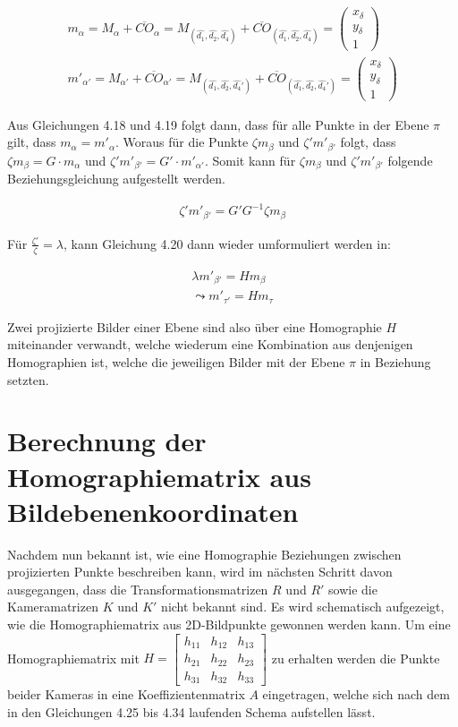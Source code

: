 \begin{gather}
	m_\alpha = M_\alpha + \overline{CO}_\alpha = M_{(\hat{d_1},\hat{d_2},\hat{d_4})} + \overline{CO}_{(\hat{d_1},\hat{d_2},\hat{d_4})} = \begin{pmatrix}
		x_\delta\\
		y_\delta\\
		1
	\end{pmatrix} \\
	m'_{\alpha'} = M_{\alpha'} + \overline{CO}_{\alpha'} = M_{(\hat{d_1},\hat{d_2},\hat{d_4}')} + \overline{CO}_{(\hat{d_1},\hat{d_2},\hat{d_4}')} = \begin{pmatrix}
	x_\delta\\
	y_\delta\\
	1
\end{pmatrix} 
\end{gather}

Aus Gleichungen 4.18 und 4.19 folgt dann, dass für alle Punkte in der Ebene $\pi$ gilt, dass $m_\alpha = m'_{\alpha}$. Woraus für die Punkte $\zeta m_\beta$ und $\zeta' m'_{\beta'}$ folgt, dass $\zeta m_\beta = G\cdot m_\alpha$ und $\zeta' m'_{\beta'} = G'\cdot m'_{\alpha'}$\cite{Elements}. Somit kann für $\zeta m_\beta$ und $\zeta' m'_{\beta'}$ folgende Beziehungsgleichung aufgestellt werden\cite{Elements}.

\begin{gather}
	\zeta' m'_{\beta'} = G' G^{-1} \zeta m_\beta
\end{gather}

Für $\frac{\zeta'}{\zeta} = \lambda$, kann Gleichung 4.20 dann wieder umformuliert werden in:

\begin{gather}
	\lambda m'_{\beta'} = H m_\beta\\
	\leadsto m'_{\tau'} = H m_\tau
\end{gather} 

Zwei projizierte Bilder einer Ebene sind also über eine Homographie $H$ miteinander verwandt, welche wiederum eine Kombination aus denjenigen Homographien ist, welche die jeweiligen Bilder mit der Ebene $\pi$ in Beziehung setzten\cite{Elements}.
 
\section{Berechnung der Homographiematrix aus Bildebenenkoordinaten}

Nachdem nun bekannt ist, wie eine Homographie Beziehungen zwischen projizierten Punkte beschreiben kann, wird im nächsten Schritt davon ausgegangen, dass die Transformationsmatrizen $R$ und $R'$ sowie die Kameramatrizen $K$ und $K'$ nicht bekannt sind. Es wird schematisch aufgezeigt, wie die Homographiematrix aus 2D-Bildpunkte gewonnen werden kann. Um eine Homographiematrix mit 
$H=
\begin{bmatrix}
h_{11}&h_{12}&h_{13}\\
h_{21}&h_{22}&h_{23}\\
h_{31}&h_{32}&h_{33}
\end{bmatrix}
$ zu erhalten werden die Punkte beider Kameras in eine Koeffizientenmatrix $A$ eingetragen, welche sich nach dem in den Gleichungen 4.25 bis 4.34 laufenden Schema aufstellen lässt. 

